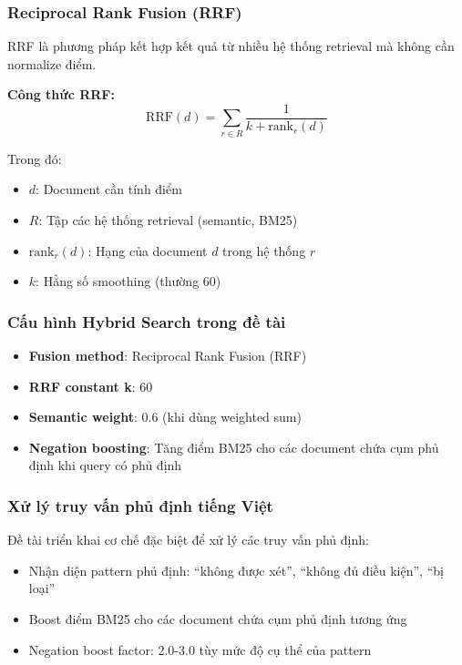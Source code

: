 \documentclass[../DoAn.tex]{subfiles}
\begin{document}
\subsubsection{Reciprocal Rank Fusion (RRF)}
RRF là phương pháp kết hợp kết quả từ nhiều hệ thống retrieval mà không cần normalize điểm.

\textbf{Công thức RRF:}
\begin{equation}
\text{RRF}(d) = \sum_{r \in R} \frac{1}{k + \text{rank}_r(d)}
\end{equation}

Trong đó:
\begin{itemize}
    \item $d$: Document cần tính điểm
    \item $R$: Tập các hệ thống retrieval (semantic, BM25)
    \item $\text{rank}_r(d)$: Hạng của document $d$ trong hệ thống $r$
    \item $k$: Hằng số smoothing (thường 60)
\end{itemize}

\subsubsection{Cấu hình Hybrid Search trong đề tài}
\begin{itemize}
    \item \textbf{Fusion method}: Reciprocal Rank Fusion (RRF)
    \item \textbf{RRF constant k}: 60
    \item \textbf{Semantic weight}: 0.6 (khi dùng weighted sum)
    \item \textbf{Negation boosting}: Tăng điểm BM25 cho các document chứa cụm phủ định khi query có phủ định
\end{itemize}

\subsubsection{Xử lý truy vấn phủ định tiếng Việt}
Đề tài triển khai cơ chế đặc biệt để xử lý các truy vấn phủ định:
\begin{itemize}
    \item Nhận diện pattern phủ định: ``không được xét'', ``không đủ điều kiện'', ``bị loại''
    \item Boost điểm BM25 cho các document chứa cụm phủ định tương ứng
    \item Negation boost factor: 2.0-3.0 tùy mức độ cụ thể của pattern
\end{itemize}
\end{document}
